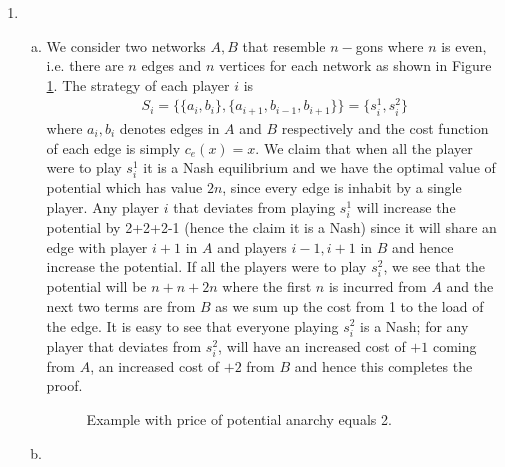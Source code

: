 \documentclass[a4paper,12pt]{article}
\theoremstyle{definition}
\begin{document}
\begin{enumerate}
\item
\begin{enumerate}[(a)]
\item We consider two networks $A, B$ that resemble $n-$gons where $n$ is even, i.e. there are $n$ edges and $n$ vertices for each network as shown in Figure \ref{fig:ngon}. The strategy of each player $i$ is 
\begin{align*}
S_i=\{\{a_i,b_i\},\{a_{i+1},b_{i-1},b_{i+1}\}\}=\{s_i^1,s_i^2\}
\end{align*}
where $a_i,b_i$ denotes edges in $A$ and $B$ respectively and the cost function of each edge is simply $c_e(x)=x$. We claim that when all the player were to play $s_i^1$ it is a Nash equilibrium and we have the optimal value of potential which has value $2n$, since every edge is inhabit by a single player. Any player $i$ that deviates from playing $s_i^1$ will increase the potential by 2+2+2-1 (hence the claim it is a Nash) since it will share an edge with player $i+1$ in $A$ and players $i-1, i+1$ in $B$ and hence increase the potential. If all the players were to play $s_i^2$, we see that the potential will be $n+n+2n$ where the first $n$ is incurred from $A$ and the next two terms are from $B$ as we sum up the cost from 1 to the load of the edge. It is easy to see that everyone playing $s_i^2$ is a Nash; for any player that deviates from $s_i^2$, will have an increased cost of $+1$ coming from $A$, an increased cost of $+2$ from $B$ and hence this completes the proof. 



\newdimen\R
\R=2cm
\begin{figure}[h]
\centering
{}
\caption{Example with price of potential anarchy equals 2.}\label{fig:ngon}
\end{figure}

\item 
\end{enumerate}

\end{enumerate}
\end{document}
